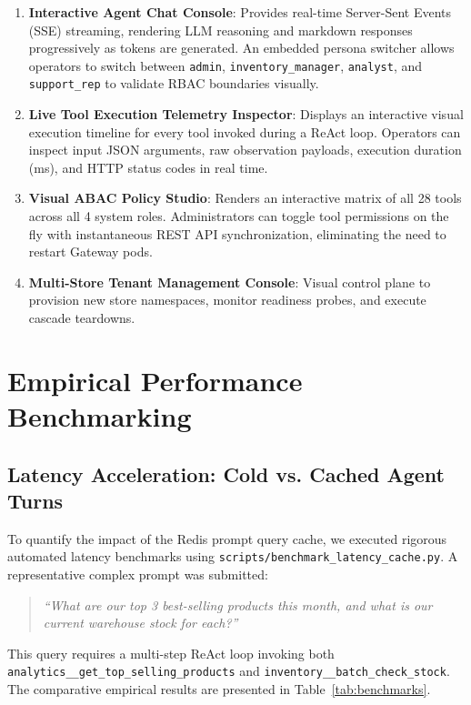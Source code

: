 \documentclass[11pt,a4paper]{article}
\begin{document}
\begin{enumerate}[leftmargin=*]
    \item \textbf{Interactive Agent Chat Console}: Provides real-time Server-Sent Events (SSE) streaming, rendering LLM reasoning and markdown responses progressively as tokens are generated. An embedded persona switcher allows operators to switch between \texttt{admin}, \texttt{inventory\_manager}, \texttt{analyst}, and \texttt{support\_rep} to validate RBAC boundaries visually.
    \item \textbf{Live Tool Execution Telemetry Inspector}: Displays an interactive visual execution timeline for every tool invoked during a ReAct loop. Operators can inspect input JSON arguments, raw observation payloads, execution duration (ms), and HTTP status codes in real time.
    \item \textbf{Visual ABAC Policy Studio}: Renders an interactive matrix of all 28 tools across all 4 system roles. Administrators can toggle tool permissions on the fly with instantaneous REST API synchronization, eliminating the need to restart Gateway pods.
    \item \textbf{Multi-Store Tenant Management Console}: Visual control plane to provision new store namespaces, monitor readiness probes, and execute cascade teardowns.
\end{enumerate}

\section{Empirical Performance Benchmarking}
\label{sec:benchmarks}

\subsection{Latency Acceleration: Cold vs. Cached Agent Turns}
To quantify the impact of the Redis prompt query cache, we executed rigorous automated latency benchmarks using \texttt{scripts/benchmark\_latency\_cache.py}. A representative complex prompt was submitted:
\begin{quote}
\textit{``What are our top 3 best-selling products this month, and what is our current warehouse stock for each?''}
\end{quote}
This query requires a multi-step ReAct loop invoking both \texttt{analytics\_\_get\_top\_selling\_products} and \texttt{inventory\_\_batch\_check\_stock}. The comparative empirical results are presented in Table~\ref{tab:benchmarks}.
\end{document}
